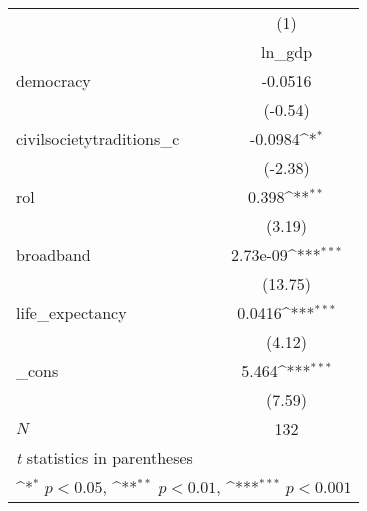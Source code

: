 {
\def\sym#1{\ifmmode^{#1}\else\(^{#1}\)\fi}
\begin{tabular}{l*{1}{c}}
\hline\hline
            &\multicolumn{1}{c}{(1)}\\
            &\multicolumn{1}{c}{ln\_gdp}\\
\hline
democracy   &     -0.0516         \\
            &     (-0.54)         \\
[1em]
civilsocietytraditions\_c&     -0.0984\sym{*}  \\
            &     (-2.38)         \\
[1em]
rol         &       0.398\sym{**} \\
            &      (3.19)         \\
[1em]
broadband   &    2.73e-09\sym{***}\\
            &     (13.75)         \\
[1em]
life\_expectancy&      0.0416\sym{***}\\
            &      (4.12)         \\
[1em]
\_cons      &       5.464\sym{***}\\
            &      (7.59)         \\
\hline
\(N\)       &         132         \\
\hline\hline
\multicolumn{2}{l}{\footnotesize \textit{t} statistics in parentheses}\\
\multicolumn{2}{l}{\footnotesize \sym{*} \(p<0.05\), \sym{**} \(p<0.01\), \sym{***} \(p<0.001\)}\\
\end{tabular}
}
